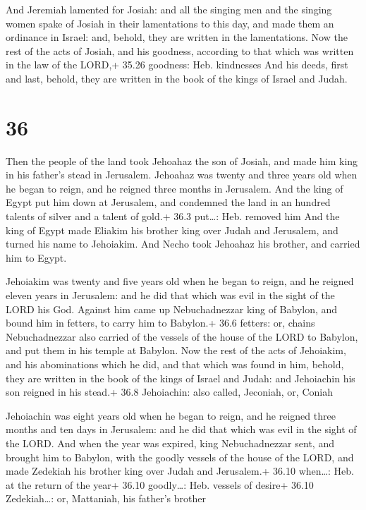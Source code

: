  And Jeremiah lamented for Josiah: and all the singing
men and the singing women spake of Josiah in their lamentations to this
day, and made them an ordinance in Israel: and, behold, they are written
in the lamentations.  Now the rest of the acts of Josiah,
and his goodness, according to that which was written in the law of the
LORD,+ 35.26 goodness: Heb. kindnesses  And his deeds,
first and last, behold, they are written in the book of the kings of
Israel and Judah.

\hypertarget{section-35}{%
\section{36}\label{section-35}}

 Then the people of the land took Jehoahaz the son of
Josiah, and made him king in his father's stead in Jerusalem.
 Jehoahaz was twenty and three years old when he began to
reign, and he reigned three months in Jerusalem.  And the
king of Egypt put him down at Jerusalem, and condemned the land in an
hundred talents of silver and a talent of gold.+ 36.3 put\ldots: Heb.
removed him  And the king of Egypt made Eliakim his brother
king over Judah and Jerusalem, and turned his name to Jehoiakim. And
Necho took Jehoahaz his brother, and carried him to Egypt.

 Jehoiakim was twenty and five years old when he began to
reign, and he reigned eleven years in Jerusalem: and he did that which
was evil in the sight of the LORD his God.  Against him came
up Nebuchadnezzar king of Babylon, and bound him in fetters, to carry
him to Babylon.+ 36.6 fetters: or, chains  Nebuchadnezzar
also carried of the vessels of the house of the LORD to Babylon, and put
them in his temple at Babylon.  Now the rest of the acts of
Jehoiakim, and his abominations which he did, and that which was found
in him, behold, they are written in the book of the kings of Israel and
Judah: and Jehoiachin his son reigned in his stead.+ 36.8 Jehoiachin:
also called, Jeconiah, or, Coniah

 Jehoiachin was eight years old when he began to reign,
and he reigned three months and ten days in Jerusalem: and he did that
which was evil in the sight of the LORD.  And when the year
was expired, king Nebuchadnezzar sent, and brought him to Babylon, with
the goodly vessels of the house of the LORD, and made Zedekiah his
brother king over Judah and Jerusalem.+ 36.10 when\ldots: Heb. at the
return of the year+ 36.10 goodly\ldots: Heb. vessels of desire+ 36.10
Zedekiah\ldots: or, Mattaniah, his father's brother

